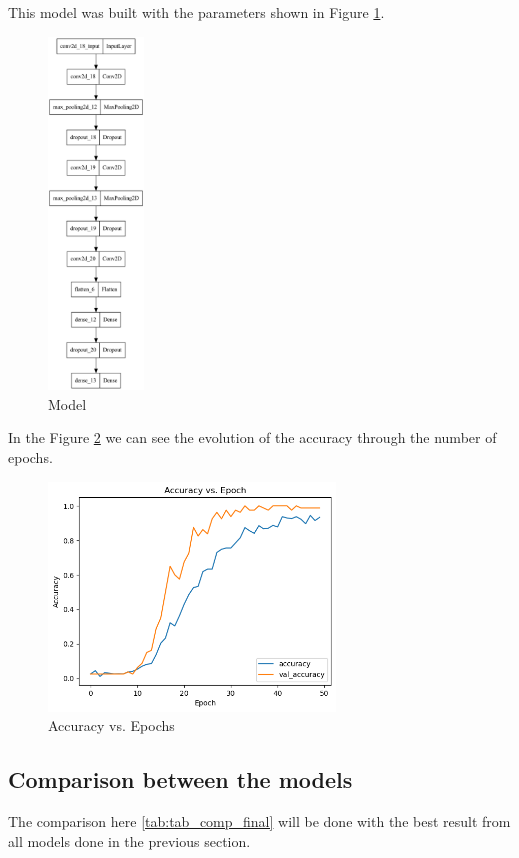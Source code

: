 \documentclass[conference]{IEEEtran}
\begin{document}
This model was built with the parameters shown in Figure \ref{fig:cnn_model}.
\begin{figure}
    \centering
    \includegraphics[width=1in]{cnn/2.png}
    \caption{Model}
    \label{fig:cnn_model}
\end{figure}



In the Figure \ref{fig:accuracy_vs_epoch} we can see the evolution of the accuracy through the number of epochs.

\begin{figure}
    \centering
    \includegraphics[width=3in]{cnn/1.png}
    \caption{Accuracy vs. Epochs}
    \label{fig:accuracy_vs_epoch}
\end{figure}

\subsection{Comparison between the models}

The comparison here \ref{tab:tab_comp_final} will be done with the best result from all models done in the previous section.
\end{document}
